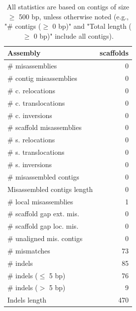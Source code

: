 \documentclass[12pt,a4paper]{article}
\begin{document}
\begin{table}[ht]
\begin{center}
\caption{All statistics are based on contigs of size $\geq$ 500 bp, unless otherwise noted (e.g., "\# contigs ($\geq$ 0 bp)" and "Total length ($\geq$ 0 bp)" include all contigs).}
\begin{tabular}{|l*{1}{|r}|}
\hline
Assembly & scaffolds \\ \hline
\# misassemblies & 0 \\ \hline
\hspace{2mm}\# contig misassemblies & 0 \\ \hline
\hspace{5mm}\# c. relocations & 0 \\ \hline
\hspace{5mm}\# c. translocations & 0 \\ \hline
\hspace{5mm}\# c. inversions & 0 \\ \hline
\hspace{2mm}\# scaffold misassemblies & 0 \\ \hline
\hspace{5mm}\# s. relocations & 0 \\ \hline
\hspace{5mm}\# s. translocations & 0 \\ \hline
\hspace{5mm}\# s. inversions & 0 \\ \hline
\# misassembled contigs & 0 \\ \hline
Misassembled contigs length & 0 \\ \hline
\# local misassemblies & 1 \\ \hline
\# scaffold gap ext. mis. & 0 \\ \hline
\# scaffold gap loc. mis. & 0 \\ \hline
\# unaligned mis. contigs & 0 \\ \hline
\# mismatches & 73 \\ \hline
\# indels & 85 \\ \hline
\hspace{5mm}\# indels ($\leq$ 5 bp) & 76 \\ \hline
\hspace{5mm}\# indels ($>$ 5 bp) & 9 \\ \hline
Indels length & 470 \\ \hline
\end{tabular}
\end{center}
\end{table}
\end{document}
